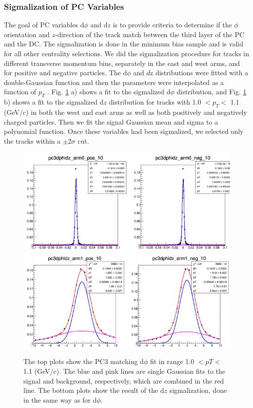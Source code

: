 \subsubsection{Sigmalization of PC Variables}
\label{sec:pc_sigmala}
The goal of PC variables d$\phi$ and d$z$ is to provide criteria to determine if the $\phi$ orientation and $z$-direction of the track match between the third layer of the PC and the DC. The sigmalization is done in the minimum bias sample and is valid for all other centrality selections.
We did the sigmalization procedure for tracks in different transverse momentum bins, separately in the east
and west arms, and for positive and negative particles. The d$\phi$ and $d$z distributions
were fitted with a double-Gaussian function and then the parameters were interpolated as
a function of $p_T$ . Fig. \ref{fig:pc3_sig} a) shows a fit to the sigmalized
d$\phi$ distribution, and Fig. \ref{fig:pc3_sig} b) shows a fit to the sigmalized d$z$ distribution for tracks with 1.0 $< p_T <$ 1.1 (GeV/c)
in both the west and east arms as well as both positively and negatively charged particles.
Then we fit the signal Gaussian mean and sigma to a polynomial function.  Once these variables had been sigmalized, we selected only
the tracks within a $\pm$2$\sigma$ cut.

\begin{figure}[h!]
\begin{center}
\includegraphics[scale=0.45]{figs/pc3dphi.png}
\includegraphics[scale=0.45]{figs/pc3dz.png}
\end{center}
\label{fig:pc3_sig}
\caption{The top plots show the PC3 matching d$\phi$ fit in range 1.0 $< pT <$ 1.1 (GeV/c).
The blue and pink lines are single Gaussian fits to the signal and background, respectively, which are combined in the red line.
The bottom plots show the result of the d$z$ sigmalization, done in the same way as for d$\phi$.}
\end{figure}

